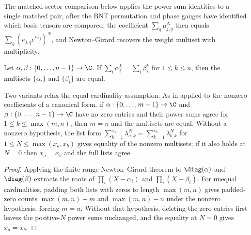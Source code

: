 The matched-sector comparison below applies the power-sum identities to a single
matched pair, after the BNT permutation and phase gauges have identified which
basis tensors are compared: the coefficient $\sum_q \mu_{j,q}^N$ then equals
$\sum_q (\nu_{j,q} e^{i\phi_j})^N$, and Newton--Girard recovers the weight
multiset with multiplicity.

\begin{lemma}
    \label{thm:bounded_power_sum_multiset}
    \leanok
    Let $\alpha, \beta : \{0, \ldots, n-1\} \to \C$. If
    $\sum_i \alpha_i^k = \sum_i \beta_i^k$ for $1 \le k \le n$, then the
    multisets $\{\alpha_i\}$ and $\{\beta_i\}$ are equal.

    Two variants relax the equal-cardinality assumption. As in
    \cite[Lemma~A.5]{Cirac2016MPDO_arXiv} applied to the nonzero coefficients
    of a canonical form, if
    $\alpha : \{0, \ldots, m-1\} \to \C$ and $\beta : \{0, \ldots, n-1\} \to \C$
    have no zero entries and their power sums agree for $1 \le k \le \max(m,n)$,
    then $m=n$ and the multisets are equal. Without a nonzero hypothesis, the
    list form $\sum_{k=1}^{x_a} \lambda_{a,k}^N = \sum_{k=1}^{x_b} \lambda_{b,k}^N$
    for $1 \le N \le \max(x_a,x_b)$ gives equality of the nonzero multisets; if
    it also holds at $N=0$ then $x_a=x_b$ and the full lists agree.
\end{lemma}

\begin{proof}
    \leanok
    Applying the finite-range Newton--Girard theorem to $\diag(\alpha)$ and
    $\diag(\beta)$ extracts the roots of $\prod_i (X - \alpha_i)$ and
    $\prod_i (X - \beta_i)$. For unequal cardinalities, padding both lists with
    zeros to length $\max(m,n)$ gives padded-zero counts $\max(m,n)-m$ and
    $\max(m,n)-n$ under the nonzero hypothesis, forcing $m=n$. Without that
    hypothesis, deleting the zero entries first leaves the positive-$N$ power
    sums unchanged, and the equality at $N=0$ gives $x_a=x_b$.
\end{proof}

